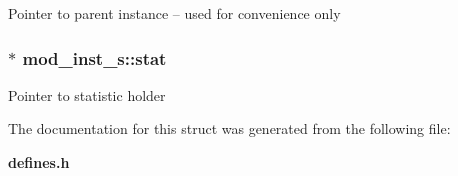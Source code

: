 Pointer to parent instance -- used for convenience only 
\subsubsection{ $\ast$ mod\_\-inst\_\-s::stat}\label{structmod__inst__s_m2}


Pointer to statistic holder 

The documentation for this struct was generated from the following file:\begin{CompactItemize}
\item 
{\bf defines.h}\end{CompactItemize}
